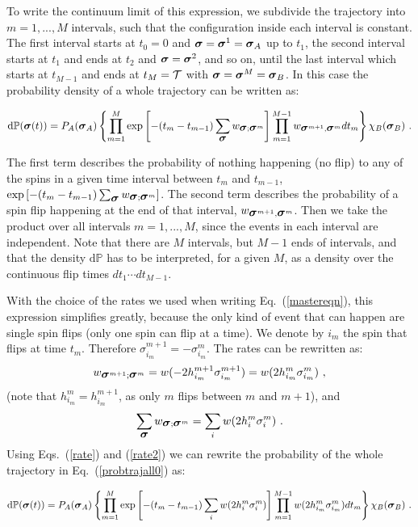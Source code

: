 \documentclass[aps,twocolumn,floats,pre,amsmath,superscriptaddress]{revtex4}
\newcommand{\beq}{\begin{equation}}
\newcommand{\eeq}{\end{equation}}
\newcommand{\<}{\langle}
\renewcommand{\>}{\rangle}
\newcommand{\bs}{ \mbox{\boldmath$\sigma$}}
\begin{document}
To write the continuum limit of this expression,
we subdivide the trajectory into $m=1,..., M$ intervals,
such that the configuration inside each interval is constant. 
The first interval starts at $t_0 =0$ and $\bs = \bs^1 = \bs_A$ up to $t_1$, the second
interval starts at $t_1$ and ends at $t_2$ and $\bs = \bs^2$, and so on, until the last
interval which starts at $t_{M-1}$ and ends at $t_{M} = {\cal T}$ with $\bs = \bs^{M} = \bs_B$. 
In this case the probability density of a whole trajectory can be written as:
\begin{widetext}
\beq
\text{d}\mathbb{P}(\bs(t))= P_A(\bs_A)
\left\{
\prod_{m=1}^M \exp\left[-(t_m-t_{m-1})\sum_{\bs}w_{\bs;\bs^m}\right] \prod_{m=1}^{M-1} w_{\bs^{m+1},\bs^{m}} dt_m
\right\}
\chi_B(\bs_B)
\ .
\label{probtrajall0}
\eeq
\end{widetext}

The first term describes the probability of nothing happening (no
flip) to any of the spins in a given time interval between $t_m$ and
$t_{m-1}$,
$\exp\left[-(t_m-t_{m-1})\sum_{\bs}w_{\bs;\bs^m}\right]$. The second
term describes the probability of a spin flip happening at the end of
that interval, $w_{\bs^{m+1},\bs^{m}}$. Then we take the product over
all intervals $m=1,..., M$, since the events in each interval are
independent. Note that there are $M$ intervals, but $M-1$ ends of intervals, and that the density $\text{d}\mathbb{P}$ has to be interpreted,
for a given $M$, as a density over the continuous flip times $dt_1 \cdots dt_{M-1}$.

With the choice of the rates we used when writing
Eq.~(\ref{mastereqn}), this expression simplifies greatly, because the
only kind of event
that can happen are single spin flips (only one spin can flip at a time).
We denote
by $i_m$ the spin that flips at time $t_m$.
Therefore $\sigma^{m+1}_{i_m} = -\sigma^{m}_{i_m}$. The rates can be
rewritten as:
\beq
w_{\bs^{m+1};\bs^{m}} =  w(-2 h^{m+1}_{i_m} \sigma^{m+1}_{i_m}) =  w(2 h^{m}_{i_m} \sigma^{m}_{i_m}) \ ,
\label{rate}
\eeq
(note that $h_{i_m}^m=h_{i_m}^{m+1}$, as only $m$ flips between $m$ and $m+1$), and
\beq
\sum_{\bs}w_{\bs;\bs^m} = \sum_i w(2 h^{m}_i \sigma^{m}_i) \ .
\label{rate2}
\eeq
Using Eqs.~(\ref{rate}) and (\ref{rate2}) we can rewrite the probability of the whole trajectory in Eq.~(\ref{probtrajall0}) as:
\begin{widetext}
\beq
\text{d}\mathbb{P}(\bs(t))= P_A(\bs_A)
\left\{
\prod_{m=1}^M \exp\left[-(t_m-t_{m-1})\sum_i w(2 h^{m}_i \sigma^{m}_i)\right] 
\prod_{m=1}^{M-1} w(2 h^{m}_{i_m} \sigma^{m}_{i_m}) dt_m
\right\}
\chi_B(\bs_B)
\ .
\label{probtrajall1}
\eeq
\end{widetext}
\end{document}
